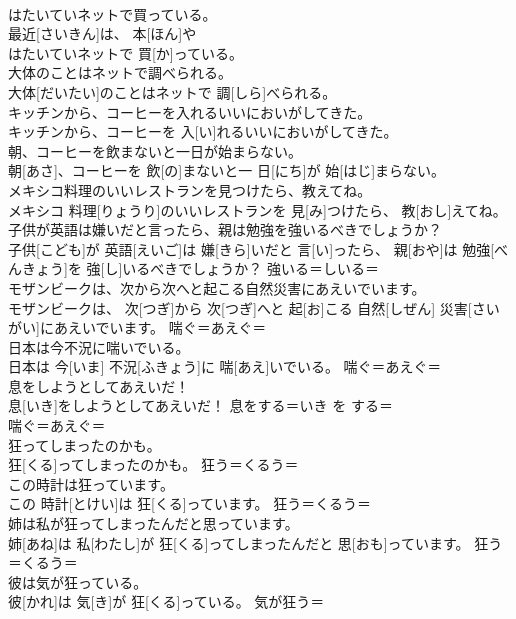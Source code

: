 \documentclass[8pt]{extreport}
\begin{document}
\begin{CJK}{UTF8}{min}
\\	はたいていネットで買っている。	
\\	最近[さいきん]は、 本[ほん]や 
\\	はたいていネットで 買[か]っている。	
\\	大体のことはネットで調べられる。	
\\	大体[だいたい]のことはネットで 調[しら]べられる。	
\\	キッチンから、コーヒーを入れるいいにおいがしてきた。	
\\	キッチンから、コーヒーを 入[い]れるいいにおいがしてきた。	
\\	朝、コーヒーを飲まないと一日が始まらない。	
\\	朝[あさ]、コーヒーを 飲[の]まないと一 日[にち]が 始[はじ]まらない。	
\\	メキシコ料理のいいレストランを見つけたら、教えてね。	
\\	メキシコ 料理[りょうり]のいいレストランを 見[み]つけたら、 教[おし]えてね。	
\\	子供が英語は嫌いだと言ったら、親は勉強を強いるべきでしょうか？	
\\	子供[こども]が 英語[えいご]は 嫌[きら]いだと 言[い]ったら、 親[おや]は 勉強[べんきょう]を 強[し]いるべきでしょうか？	強いる＝しいる＝ 
\\	モザンビークは、次から次へと起こる自然災害にあえいでいます。	
\\	モザンビークは、 次[つぎ]から 次[つぎ]へと 起[お]こる 自然[しぜん] 災害[さいがい]にあえいでいます。	喘ぐ＝あえぐ＝ 
\\	日本は今不況に喘いでいる。	
\\	日本は 今[いま] 不況[ふきょう]に 喘[あえ]いでいる。	喘ぐ＝あえぐ＝ 
\\	息をしようとしてあえいだ！	
\\	息[いき]をしようとしてあえいだ！	息をする＝いき を する＝ 
\\	喘ぐ＝あえぐ＝ 
\\	狂ってしまったのかも。	
\\	狂[くる]ってしまったのかも。	狂う＝くるう＝ 
\\	この時計は狂っています。	
\\	この 時計[とけい]は 狂[くる]っています。	狂う＝くるう＝ 
\\	姉は私が狂ってしまったんだと思っています。	
\\	姉[あね]は 私[わたし]が 狂[くる]ってしまったんだと 思[おも]っています。	狂う＝くるう＝ 
\\	彼は気が狂っている。	
\\	彼[かれ]は 気[き]が 狂[くる]っている。	気が狂う＝ 

\end{CJK}
\end{document}
